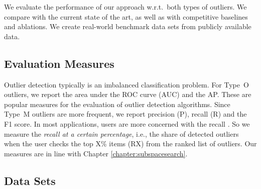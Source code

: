 We evaluate the performance of our approach w.r.t.\ both types of outliers. We compare with the current state of the art, as well as with competitive baselines and ablations. We create real-world benchmark data sets from publicly available data. 

\subsection{Evaluation Measures}

Outlier detection typically is an imbalanced classification problem. 
For Type~O outliers, we report the area under the \acrshort{ROC} curve (\acrshort{AUC}) and the \gls{AP}. 
These are popular measures for the evaluation of outlier detection algorithms. Since Type~M outliers are more frequent, we report precision (P), recall (R) and the F1 score. 
In most applications, users are more concerned with the recall \cite{DBLP:conf/emnlp/ZhuangWTKH17}. So we measure the \textit{recall at a certain percentage}, i.e., the share of detected outliers when the user checks the top X\% items (RX) from the ranked list of outliers. Our measures are in line with Chapter \ref{chapter:subspacesearch}.  

\subsection{Data Sets}

